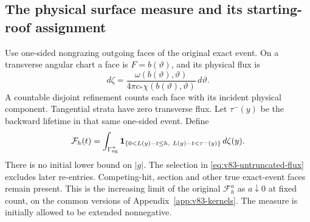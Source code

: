 \subsection{The physical surface measure and its starting-roof assignment}
Use one-sided nongrazing outgoing faces of the original exact event.
On a transverse angular chart a face is $F=b(\vartheta)$, and its
physical flux is
\begin{equation}\label{eq:v83-surface-flux}
 d\zeta=\frac{\omega(b(\vartheta),\vartheta)}
                 {4\pi c_*\chi(b(\vartheta),\vartheta)}\,d\vartheta.
\end{equation}
A countable disjoint refinement counts each face with its incident
physical component. Tangential strata have zero transverse flux.
Let $\tau^-(y)$ be the backward lifetime in that same one-sided event.
Define
\begin{equation}\label{eq:v83-untruncated-flux}
 \mathcal F_h(t)=\int_{\Gamma_{\rm ng}^+}
  \one_{\{0<L(y)-t\le h,\ L(y)-t<\tau^-(y)\}}\,d\zeta(y).
\end{equation}
There is no initial lower bound on $|g|$. The selection in
\eqref{eq:v83-untruncated-flux} excludes later re-entries. Competing-hit,
section and other true exact-event faces remain present. This is the
increasing limit of the original $\mathcal F_h^a$ as $a\downarrow0$
at fixed count, on the common versions of Appendix~\ref{app:v83-kernels}.
The measure is initially allowed to be extended nonnegative.

